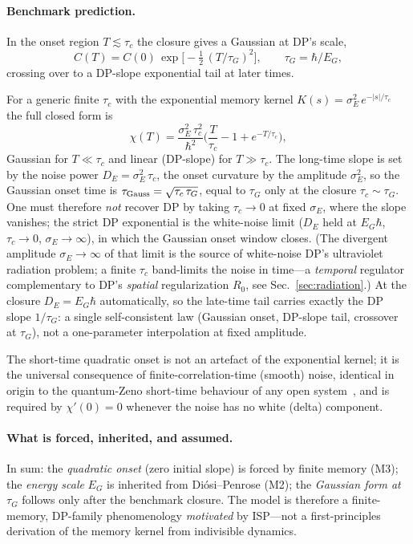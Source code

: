 \documentclass[aps,prd,onecolumn,amsmath,amssymb,nofootinbib,superscriptaddress]{revtex4-2}
\begin{document}
\paragraph{Benchmark prediction.} In the onset region $T\lesssim\tau_c$ the closure gives a Gaussian
at DP's scale,
\begin{equation}
\boxed{\,C(T)=C(0)\,\exp\!\Big[-\tfrac12\,(T/\tau_G)^2\Big],\qquad \tau_G=\hbar/E_G,\,}
\end{equation}
crossing over to a DP-slope exponential tail at later times.

For a generic finite $\tau_c$ with the exponential memory kernel $K(s)=\sigma_E^2\,e^{-|s|/\tau_c}$
the full closed form is
\begin{equation}
\chi(T)=\frac{\sigma_E^2\,\tau_c^2}{\hbar^2}\Big(\frac{T}{\tau_c}-1+e^{-T/\tau_c}\Big),
\end{equation}
Gaussian for $T\ll\tau_c$ and linear (DP-slope) for $T\gg\tau_c$. The long-time slope is set by the
noise power $D_E=\sigma_E^2\,\tau_c$, the onset curvature by the amplitude $\sigma_E^2$, so the
Gaussian onset time is $\tau_{\rm Gauss}=\sqrt{\tau_c\,\tau_G}$, equal to $\tau_G$ only at the
closure $\tau_c\sim\tau_G$. One must therefore \emph{not} recover DP by taking $\tau_c\to0$ at fixed
$\sigma_E$, where the slope vanishes; the strict DP exponential is the white-noise limit ($D_E$ held
at $E_G\hbar$, $\tau_c\to0$, $\sigma_E\to\infty$), in which the Gaussian onset window closes. (The
divergent amplitude $\sigma_E\to\infty$ of that limit is the source of white-noise DP's ultraviolet
radiation problem; a finite $\tau_c$ band-limits the noise in time---a \emph{temporal} regulator
complementary to DP's \emph{spatial} regularization $R_0$, see Sec.~\ref{sec:radiation}.) At the
closure $D_E=E_G\hbar$ automatically, so the late-time tail carries exactly the DP slope $1/\tau_G$:
a single self-consistent law (Gaussian onset, DP-slope tail, crossover at $\tau_G$), not a
one-parameter interpolation at fixed amplitude.

The short-time quadratic onset is not an artefact of the exponential kernel; it is the universal
consequence of finite-correlation-time (smooth) noise, identical in origin to the quantum-Zeno
short-time behaviour of any open system~\cite{R22}, and is required by $\chi'(0)=0$ whenever the
noise has no white (delta) component.

\paragraph{What is forced, inherited, and assumed.} In sum: the \emph{quadratic onset} (zero initial
slope) is forced by finite memory (M3); the \emph{energy scale} $E_G$ is inherited from
Di\'osi--Penrose (M2); the \emph{Gaussian form at} $\tau_G$ follows only after the benchmark closure.
The model is therefore a finite-memory, DP-family phenomenology \emph{motivated} by ISP---not a
first-principles derivation of the memory kernel from indivisible dynamics.
\end{document}
